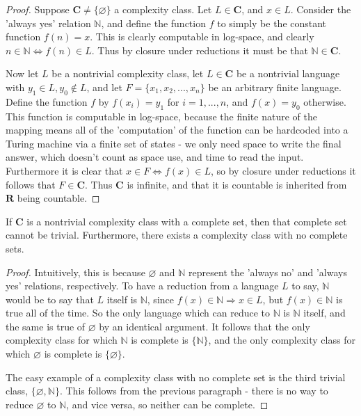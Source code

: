 \begin{proof}
	Suppose $\textbf{C} \neq \{\varnothing\}$ a complexity class. Let $L \in \textbf{C}$, and $x \in L$. Consider the 'always yes' relation $\mathbb{N}$, and define the function $f$ to simply be the constant function $f(n) = x$. This is clearly computable in log-space, and clearly $n \in \mathbb{N} \iff f(n) \in L$. Thus by closure under reductions it must be that $\mathbb{N} \in \textbf{C}$. 
	\par Now let $L$ be a nontrivial complexity class, let $L \in \textbf{C}$ be a nontrivial language with $y_1 \in L, y_0 \notin L$, and let $F = \{x_1,x_2,...,x_n\}$ be an arbitrary finite language. Define the function $f$ by $f(x_i) = y_1$ for $i=1,...,n$, and $f(x) = y_0$ otherwise. This function is computable in log-space, because the finite nature of the mapping means all of the 'computation' of the function can be hardcoded into a Turing machine via a finite set of states - we only need space to write the final answer, which doesn't count as space use, and time to read the input. Furthermore it is clear that $x \in F \iff f(x) \in L$, so by closure under reductions it follows that $F \in \textbf{C}$. Thus $\textbf{C}$ is infinite, and that it is countable is inherited from $\textbf{R}$ being countable.
\end{proof}
\begin{lemma}
	If $\textbf{C}$ is a nontrivial complexity class with a complete set, then that complete set cannot be trivial. Furthermore, there exists a complexity class with no complete sets.
\end{lemma}
\begin{proof}
	Intuitively, this is because $\varnothing$ and $\mathbb{N}$ represent the 'always no' and 'always yes' relations, respectively. To have a reduction from a language $L$ to say, $\mathbb{N}$ would be to say that $L$ itself is $\mathbb{N}$, since $f(x) \in \mathbb{N} \Rightarrow x \in L$, but $f(x) \in \mathbb{N}$ is true all of the time. So the only language which can reduce to $\mathbb{N}$ is $\mathbb{N}$ itself, and the same is true of $\varnothing$ by an identical argument. It follows that the only complexity class for which $\mathbb{N}$ is complete is $\{\mathbb{N}\}$, and the only complexity class for which $\varnothing$ is complete is $\{\varnothing\}$.
	\par The easy example of a complexity class with no complete set is the third trivial class, $\{\varnothing,\mathbb{N}\}$. This follows from the previous paragraph - there is no way to reduce $\varnothing$ to $\mathbb{N}$, and vice versa, so neither can be complete. 
\end{proof}
